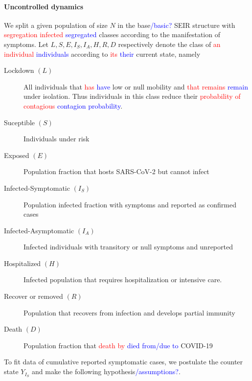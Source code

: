 \paragraph{Uncontrolled dynamics}
    We split a given population of size $N$ in the base\textcolor{blue}{/basic?} SEIR
structure with \textcolor{red}{segregation infected} \textcolor{blue}{segregated} classes according to the manifestation
of symptoms. Let $L, S, E, I_S, I_A, H, R, D$ respectively denote the
class of \textcolor{red}{an individual} \textcolor{blue}{individuals} according to \textcolor{red}{its} \textcolor{blue}{their} current state, namely
%
\begin{description}
    \item[Lockdown $(L)$]
        All individuals that \textcolor{red}{has} \textcolor{blue}{have} low or null mobility and \textcolor{red}{that remains} \textcolor{blue}{remain} under
        isolation. Thus individuals in this class reduce their \textcolor{red}{probability of
        contagious} \textcolor{blue}{contagion probability}.
    \item[Suceptible $(S)$]
        Individuals under risk
    \item[Exposed $(E)$]
        Population fraction that hosts SARS-CoV-2 but cannot infect
    \item[Infected-Symptomatic $(I_S)$]
        Population infected fraction with symptoms and reported as confirmed
        cases
    \item[Infected-Asymptomatic $(I_A)$]
        Infected individuals with transitory or null symptoms and unreported
    \item[Hospitalized $(H)$]
        Infected population that requires hospitalization or intensive care.
    \item[Recover or removed $(R)$]
        Population that recovers from infection and develops partial immunity
    \item[Death $(D)$]
        Population fraction that \textcolor{red}{death by} \textcolor{blue}{died from/due to} COVID-19
\end{description}
%
To fit data of cumulative reported symptomatic cases, we
postulate the counter state $Y_{I_S}$ and make the following hypothesis\textcolor{blue}{/assumptions?}.
%
%
